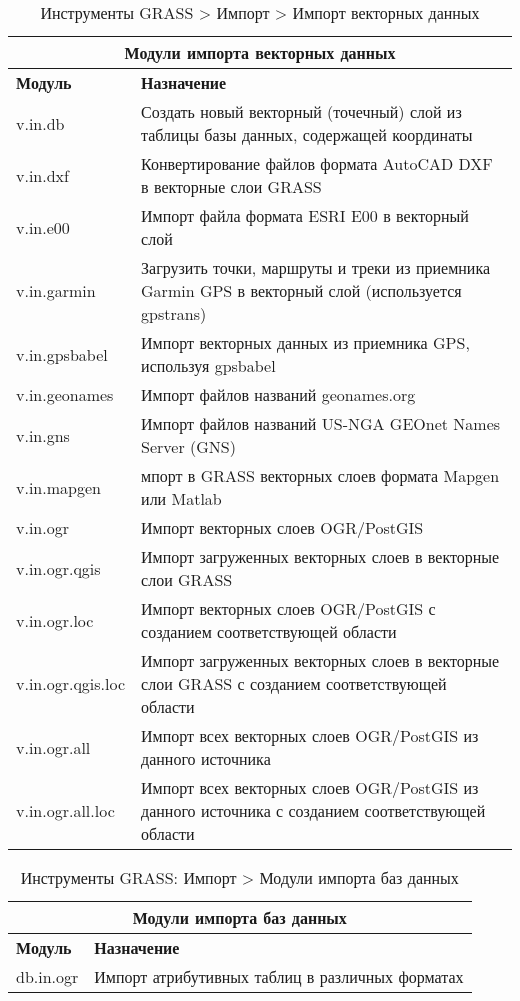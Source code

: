 {\renewcommand{\arraystretch}{0.7}
\begin{table}[htb]
\centering
 \begin{tabular}{|p{2.5cm}|p{12.5cm}|}
  \hline \multicolumn{2}{|c|}{\textbf{Модули импорта векторных данных}} \\
  \hline \textbf{Модуль} & \textbf{Назначение} \\
  \hline v.in.db & Создать новый векторный (точечный) слой из таблицы
  базы данных, содержащей координаты \\
  \hline v.in.dxf & Конвертирование файлов формата AutoCAD DXF в векторные
  слои GRASS \\
  \hline v.in.e00 & Импорт файла формата ESRI E00 в векторный слой \\
  \hline v.in.garmin & Загрузить точки, маршруты и треки из приемника
  Garmin GPS в векторный слой (используется gpstrans) \\
  \hline v.in.gpsbabel & Импорт векторных данных из приемника GPS,
  используя gpsbabel \\
  \hline v.in.geonames & Импорт файлов названий geonames.org \\
  \hline v.in.gns & Импорт файлов названий US-NGA GEOnet Names Server (GNS) \\
  \hline v.in.mapgen & мпорт в GRASS векторных слоев формата Mapgen
  или Matlab \\
  \hline v.in.ogr & Импорт векторных слоев OGR/PostGIS \\
  \hline v.in.ogr.qgis & Импорт загруженных векторных слоев в векторные
  слои GRASS \\
  \hline v.in.ogr.loc & Импорт векторных слоев OGR/PostGIS с созданием
  соответствующей области \\
  \hline v.in.ogr.qgis.loc & Импорт загруженных векторных слоев в
  векторные слои GRASS с созданием соответствующей области \\
  \hline v.in.ogr.all & Импорт всех векторных слоев OGR/PostGIS из
  данного источника \\
  \hline v.in.ogr.all.loc & Импорт всех векторных слоев OGR/PostGIS из
  данного источника с созданием соответствующей области \\
\hline
\end{tabular}
\caption{Инструменты GRASS > Импорт > Импорт векторных данных}
\end{table}}

{\renewcommand{\arraystretch}{0.7}
\begin{table}[H]
\centering
 \begin{tabular}{|p{2.5cm}|p{12.5cm}|}
  \hline \multicolumn{2}{|c|}{\textbf{Модули импорта баз данных}} \\
  \hline \textbf{Модуль} & \textbf{Назначение} \\
  \hline db.in.ogr & Импорт атрибутивных таблиц в различных форматах \\
\hline
\end{tabular}
\caption{Инструменты GRASS: Импорт > Модули импорта баз данных}
\end{table}}

